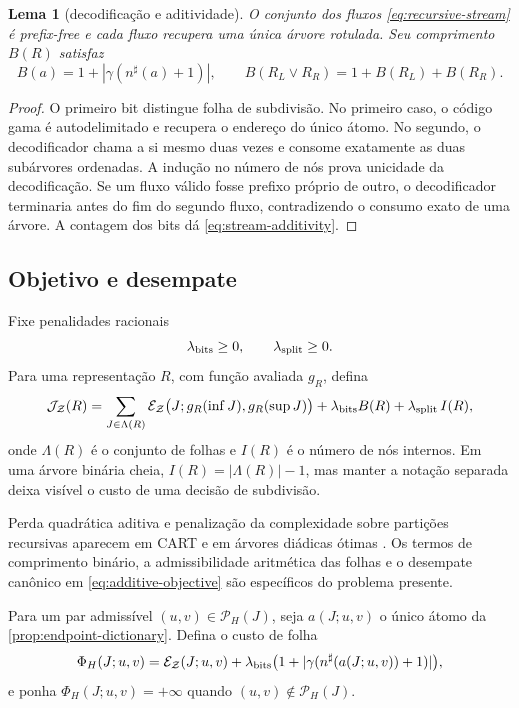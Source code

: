\documentclass[11pt,a4paper]{article}
\newtheorem{lemma}[theorem]{Lema}
\theoremstyle{definition}
\theoremstyle{remark}
\newcommand{\Pairs}{\mathcal{P}}
\newcommand{\cost}{\mathcal{J}}
\newcommand{\loss}{\mathcal{E}}
\begin{document}
\begin{lemma}[decodificação e aditividade]
\label{lem:recursive-stream}
O conjunto dos fluxos \eqref{eq:recursive-stream} é prefix-free e cada fluxo
recupera uma única árvore rotulada. Seu comprimento $B(R)$ satisfaz
\begin{equation}
 B(a)=1+|\gamma(n^\sharp(a)+1)|,\qquad
 B(R_L\vee R_R)=1+B(R_L)+B(R_R).
 \label{eq:stream-additivity}
\end{equation}
\end{lemma}

\begin{proof}
O primeiro bit distingue folha de subdivisão. No primeiro caso, o código gama
é autodelimitado e recupera o endereço do único átomo. No segundo, o
decodificador chama a si mesmo duas vezes e consome exatamente as duas
subárvores ordenadas. A indução no número de nós prova unicidade da
decodificação. Se um fluxo válido fosse prefixo próprio de outro, o
decodificador terminaria antes do fim do segundo fluxo, contradizendo o
consumo exato de uma árvore. A contagem dos bits dá
\eqref{eq:stream-additivity}.
\end{proof}

\subsection{Objetivo e desempate}

Fixe penalidades racionais
\[
 \lambda_{\rm bits}\ge0,\qquad \lambda_{\rm split}\ge0.
\]
Para uma representação $R$, com função avaliada $g_R$, defina
\begin{equation}
 \cost_{\mathcal Z}(R)
 =\sum_{J\in\Lambda(R)}
   \loss_{\mathcal Z}\bigl(J;g_R(\inf J),g_R(\sup J)\bigr)
 +\lambda_{\rm bits}B(R)
 +\lambda_{\rm split}\,I(R),
 \label{eq:additive-objective}
\end{equation}
onde $\Lambda(R)$ é o conjunto de folhas e $I(R)$ é o número de nós internos.
Em uma árvore binária cheia, $I(R)=|\Lambda(R)|-1$, mas manter a notação
separada deixa visível o custo de uma decisão de subdivisão.

Perda quadrática aditiva e penalização da complexidade sobre partições
recursivas aparecem em CART e em árvores diádicas ótimas
\citep{breiman1984,donoho1997,blanchard2007}. Os termos de comprimento binário,
a admissibilidade aritmética das folhas e o desempate canônico em
\eqref{eq:additive-objective} são específicos do problema presente.

Para um par admissível $(u,v)\in\Pairs_H(J)$, seja $a(J;u,v)$ o único átomo
da \cref{prop:endpoint-dictionary}. Defina o custo de folha
\begin{equation}
 \Phi_H(J;u,v)=
 \loss_{\mathcal Z}(J;u,v)
 +\lambda_{\rm bits}
  \bigl(1+|\gamma(n^\sharp(a(J;u,v))+1)|\bigr),
 \label{eq:leaf-cost}
\end{equation}
e ponha $\Phi_H(J;u,v)=+\infty$ quando $(u,v)\notin\Pairs_H(J)$.
\end{document}
